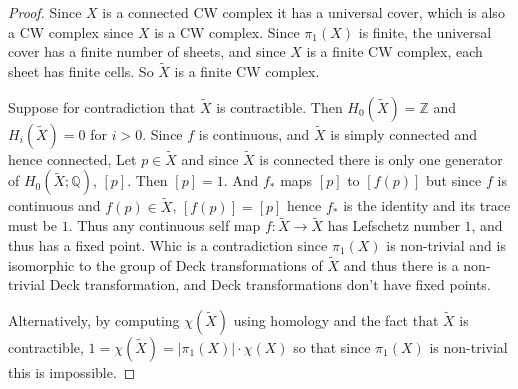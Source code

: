 \documentclass[a4paper]{article}
\theoremstyle{theorem}
\theoremstyle{definition}
\theoremstyle{remark}
\theoremstyle{gremark}
\theoremstyle{discussion}
\theoremstyle{notation}
\begin{document}
\begin{proof}
	Since $X$ is a connected CW complex it has a universal cover, which is also a CW complex since $X$ is a CW complex. Since $\pi_1(X)$ is finite, the universal cover has a finite number of sheets, and since $X$ is a finite CW complex, each sheet has finite cells. So $\widetilde{X}$ is a finite CW complex. 
	\medbreak
	
	Suppose for contradiction that $\widetilde{X}$ is contractible. Then $H_0(\widetilde{X})=\mathbb{Z}$ and $H_i(\widetilde{X})=0$ for $i>0$. Since $f$ is continuous, and $\widetilde{X}$ is simply connected and hence connected,
	Let $p\in \widetilde{X}$ and since $\widetilde{X}$ is connected there is only one generator of $H_0(\widetilde{X};\mathbb{Q}) $, $[p]$. Then $[p]=1$. And $f_*$ maps $[p]$ to $[f(p)]$ but since $f$ is continuous and $f(p)\in\widetilde{X}$, $[f(p)]=[p]$ hence $f_*$ is the identity and its trace must be $1$.  	
	Thus any continuous self map $f:\widetilde{X}\to\widetilde{X}$ has Lefschetz number $1$, and thus has a fixed point.  
	Whic is a contradiction since $\pi_1(X)$ is non-trivial and is isomorphic to the group of Deck transformations of $\widetilde{X}$ and thus there is a non-trivial Deck transformation, and Deck transformations don't have fixed points. 
	
	Alternatively, by computing $\chi(\widetilde{X})$ using homology and the fact that $\widetilde{X}$ is contractible, $1=\chi(\widetilde{X})=|\pi_1(X)|\cdot \chi(X)$ so that since $\pi_1(X)$ is non-trivial this is impossible.
\end{proof}
	
	
\end{document}
